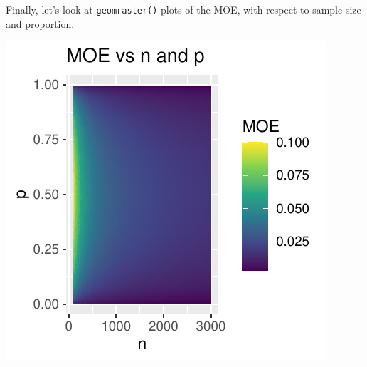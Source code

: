 \documentclass{article}\usepackage[]{graphicx}\usepackage[]{xcolor}
\newenvironment{Figure}
  {\par\medskip\noindent\minipage{\linewidth}}
  {\endminipage\par\medskip}
\begin{document}
\begin{multicols}{2}
Finally, let's look at \texttt{geom\textunderscore raster()} plots of the MOE, with respect to sample size and proportion.

\begin{Figure}
\includegraphics{MOE.pdf}
\label{fig:MOE}
\end{Figure}


\end{multicols}
\end{document}
